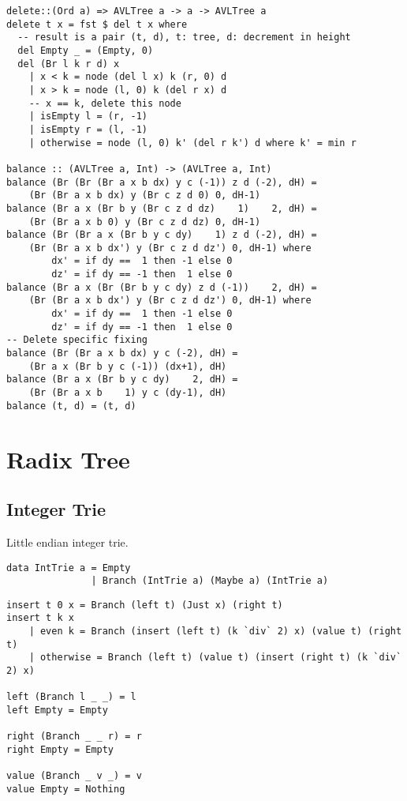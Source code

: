 \documentclass{article}
\begin{document}
\begin{lstlisting}[caption=AVL tree deletion]
delete::(Ord a) => AVLTree a -> a -> AVLTree a
delete t x = fst $ del t x where
  -- result is a pair (t, d), t: tree, d: decrement in height
  del Empty _ = (Empty, 0)
  del (Br l k r d) x
    | x < k = node (del l x) k (r, 0) d
    | x > k = node (l, 0) k (del r x) d
    -- x == k, delete this node
    | isEmpty l = (r, -1)
    | isEmpty r = (l, -1)
    | otherwise = node (l, 0) k' (del r k') d where k' = min r

balance :: (AVLTree a, Int) -> (AVLTree a, Int)
balance (Br (Br (Br a x b dx) y c (-1)) z d (-2), dH) =
    (Br (Br a x b dx) y (Br c z d 0) 0, dH-1)
balance (Br a x (Br b y (Br c z d dz)    1)    2, dH) =
    (Br (Br a x b 0) y (Br c z d dz) 0, dH-1)
balance (Br (Br a x (Br b y c dy)    1) z d (-2), dH) =
    (Br (Br a x b dx') y (Br c z d dz') 0, dH-1) where
        dx' = if dy ==  1 then -1 else 0
        dz' = if dy == -1 then  1 else 0
balance (Br a x (Br (Br b y c dy) z d (-1))    2, dH) =
    (Br (Br a x b dx') y (Br c z d dz') 0, dH-1) where
        dx' = if dy ==  1 then -1 else 0
        dz' = if dy == -1 then  1 else 0
-- Delete specific fixing
balance (Br (Br a x b dx) y c (-2), dH) =
    (Br a x (Br b y c (-1)) (dx+1), dH)
balance (Br a x (Br b y c dy)    2, dH) =
    (Br (Br a x b    1) y c (dy-1), dH)
balance (t, d) = (t, d)
\end{lstlisting}

\section{Radix Tree}

\subsection{Integer Trie}
Little endian integer trie.

\lstset{language=Haskell}
\begin{lstlisting}[caption=Algebraic definition of integer trie]
data IntTrie a = Empty
               | Branch (IntTrie a) (Maybe a) (IntTrie a)
\end{lstlisting}

\lstset{language=Haskell}
\begin{lstlisting}[caption=Integer trie insertion]
insert t 0 x = Branch (left t) (Just x) (right t)
insert t k x
    | even k = Branch (insert (left t) (k `div` 2) x) (value t) (right t)
    | otherwise = Branch (left t) (value t) (insert (right t) (k `div` 2) x)

left (Branch l _ _) = l
left Empty = Empty

right (Branch _ _ r) = r
right Empty = Empty

value (Branch _ v _) = v
value Empty = Nothing
\end{lstlisting}
\end{document}
